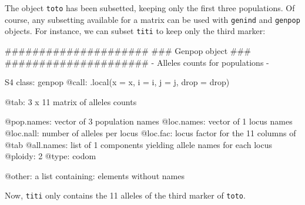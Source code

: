 \documentclass{article}
\begin{document}
\noindent The object \texttt{toto} has been subsetted, keeping only the
first three populations.
Of course, any subsetting available for a matrix can be used with \texttt{genind} and \texttt{genpop} objects.
For instance, we can subset \texttt{titi} to keep only the third marker:
\begin{Schunk}
\begin{Soutput}
       #####################
       ### Genpop object ### 
       #####################
- Alleles counts for populations - 

S4 class:  genpop
@call: .local(x = x, i = i, j = j, drop = drop)

@tab:  3 x 11 matrix of alleles counts

@pop.names: vector of  3 population names
@loc.names: vector of  1 locus names
@loc.nall: number of alleles per locus
@loc.fac: locus factor for the  11 columns of @tab
@all.names: list of  1 components yielding allele names for each locus
@ploidy:  2
@type:  codom

@other: a list containing: elements without names 
\end{Soutput}
\end{Schunk}

\noindent Now, \texttt{titi} only contains the 11 alleles of the third
marker of \texttt{toto}.
\\
\end{document}
